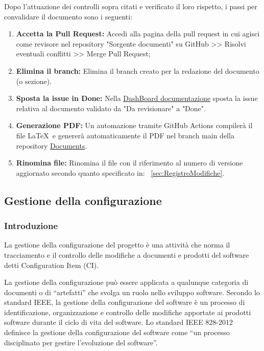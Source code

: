 \documentclass{article}
\begin{document}
Dopo l'attuazione dei controlli sopra citati e verificato il loro rispetto, i passi per convalidare il documento sono i seguenti:
\begin{enumerate}
 \item \textbf{Accetta la Pull Request:} Accedi alla pagina della pull request in cui agisci come revisore nel repository "Sorgente documenti" su GitHub >> Risolvi eventuali conflitti >> Merge Pull Request;
    \item \textbf{Elimina il branch: } Elimina il branch creato per la redazione del documento (o sezione).
     \item \textbf{Sposta la issue in Done:} Nella \href{https://github.com/orgs/ByteOps-swe/projects/1/views/1}{DashBoard documentazione} sposta la issue relativa al documento validato da "Da revisionare" a "Done".
     \item \textbf{Generazione PDF:} Un automazione tramite GitHub Actions compilerà il file   \LaTeX\ e genererà automaticamente il PDF nel branch main della repository \href{https://github.com/ByteOps-swe/Documents}{Documents}. 
     \item \textbf{Rinomina file: }Rinomina il file con il riferimento al numero di versione aggiornato secondo quanto specificato in: ~\ref{sec:RegistroModifiche}.
     
     
\end{enumerate}
\subsection{Gestione della configurazione}
\subsubsection{Introduzione}
La gestione della configurazione del progetto è una attività che norma il tracciamento e il controllo delle modifiche a documenti e prodotti del software detti Configuration Item (CI).

La gestione della configurazione può essere applicata a qualunque categoria di documenti o di “artefatti” che svolga un ruolo nello sviluppo software.
Secondo lo standard IEEE, la gestione della configurazione del software è un processo di identificazione, organizzazione e controllo delle modifiche apportate ai prodotti software durante il ciclo di vita del software.
 Lo standard IEEE 828-2012 definisce la gestione della configurazione del software come “un processo disciplinato per gestire l’evoluzione del software”. 
\end{document}

